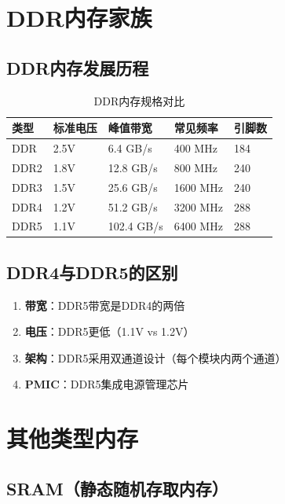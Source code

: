 \documentclass[12pt,UTF8]{ctexbook}
\begin{document}
\chapter{DDR内存家族}

\section{DDR内存发展历程}

\begin{table}[H]
    \centering
    \begin{tabular}{|p{2cm}|p{3cm}|p{3cm}|p{3cm}|p{3cm}|}
        \hline
        \textbf{类型} & \textbf{标准电压} & \textbf{峰值带宽} & \textbf{常见频率} & \textbf{引脚数} \\
        \hline
        DDR & 2.5V & 6.4 GB/s & 400 MHz & 184 \\
        \hline
        DDR2 & 1.8V & 12.8 GB/s & 800 MHz & 240 \\
        \hline
        DDR3 & 1.5V & 25.6 GB/s & 1600 MHz & 240 \\
        \hline
        DDR4 & 1.2V & 51.2 GB/s & 3200 MHz & 288 \\
        \hline
        DDR5 & 1.1V & 102.4 GB/s & 6400 MHz & 288 \\
        \hline
    \end{tabular}
    \caption{DDR内存规格对比}
    \label{tab:ddr_specs}
\end{table}

\section{DDR4与DDR5的区别}

\begin{enumerate}
    \item \textbf{带宽}：DDR5带宽是DDR4的两倍
    \item \textbf{电压}：DDR5更低（1.1V vs 1.2V）
    \item \textbf{架构}：DDR5采用双通道设计（每个模块内两个通道）
    \item \textbf{PMIC}：DDR5集成电源管理芯片
\end{enumerate}

\chapter{其他类型内存}

\section{SRAM（静态随机存取内存）}
\end{document}
